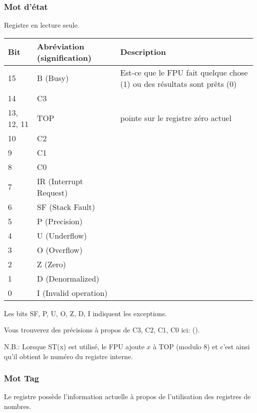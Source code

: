 \subsubsection{Mot d'état}

\label{FPU_status_word}
Registre en lecture seule.

\small
\begin{center}
\begin{tabular}{ | l | l | l | }
\hline
Bit &
Abréviation (signification) &
Description \\
\hline
15   & B (Busy) & Est-ce que le FPU fait quelque chose (1)
ou des résultats sont prêts (0) \\
\hline
14   & C3 & \\
\hline
13, 12, 11 & TOP & pointe sur le registre zéro actuel \\
\hline
10 & C2 & \\
\hline
9  & C1 & \\
\hline
8  & C0 & \\
\hline
7  & IR (Interrupt Request) & \\
\hline
6  & SF (Stack Fault) & \\
\hline
5  & P (Precision) & \\
\hline
4  & U (Underflow) & \\
\hline
3  & O (Overflow) & \\
\hline
2  & Z (Zero) & \\
\hline
1  & D (Denormalized) & \\
\hline
0  & I (Invalid operation) & \\
\hline
\end{tabular}
\end{center}
\normalsize

Les bits SF, P, U, O, Z, D, I indiquent les exceptions.

Vous trouverez des précisions à propos de C3, C2, C1, C0 ici: ().

N.B.: Lorsque ST(x) est utilisé, le FPU ajoute $x$ à TOP (modulo 8) et c'est ainsi
qu'il obtient le numéro du registre interne.

\subsubsection{Mot Tag}

Le registre possède l'information actuelle à propos de l'utilisation des registres
de nombres.

